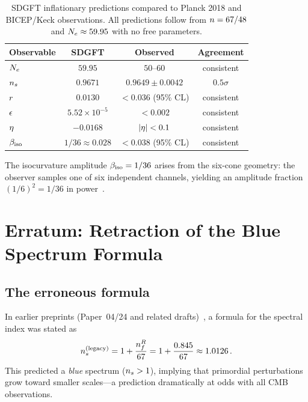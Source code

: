 \documentclass[a4paper,11pt]{article}
\begin{document}
\begin{table}[h]
\centering
\caption{SDGFT inflationary predictions compared to Planck 2018
and BICEP/Keck observations.  All predictions follow from
$n = 67/48$ and $N_e \approx 59.95$ with no free parameters.}
\label{tab:observables}
\begin{tabular}{@{}lccc@{}}
\toprule
Observable & SDGFT & Observed & Agreement \\
\midrule
$N_e$       & $59.95$  & $50$--$60$
  & consistent \\
$n_s$       & $0.9671$ & $0.9649 \pm 0.0042$
  & $0.5\sigma$ \\
$r$      & $0.0130$ & $< 0.036$ (95\% CL)
  & consistent \\
$\epsilon$    & $5.52 \times 10^{-5}$ & $< 0.002$
  & consistent \\
$\eta$    & $-0.0168$ & $\lvert\eta\rvert < 0.1$
  & consistent \\
$\beta_{\mathrm{iso}}$  & $1/36 \approx 0.028$ & $< 0.038$ (95\% CL)
  & consistent \\
\bottomrule
\end{tabular}
\end{table}

The isocurvature amplitude $\beta_{\mathrm{iso}} = 1/36$ arises from the
six-cone geometry: the observer samples one of six independent
channels, yielding an amplitude fraction $(1/6)^2 = 1/36$ in
power~\cite{Goldstein_Paper22}.

\section{Erratum: Retraction of the Blue Spectrum Formula}
\label{sec:erratum}

\subsection{The erroneous formula}

In earlier preprints (Paper~04/24 and related
drafts)~\cite{Goldstein_Paper04_v1}, a formula for the spectral
index was stated as
\begin{equation}
  n_s^{(\mathrm{legacy})}
    = 1 + \frac{n^R_f}{67}
    = 1 + \frac{0.845}{67}
    \approx 1.0126\,.
  \label{eq:ns_blue}
\end{equation}
This predicted a \emph{blue} spectrum ($n_s > 1$), implying that
primordial perturbations grow toward smaller scales---a prediction
dramatically at odds with all CMB observations.
\end{document}

